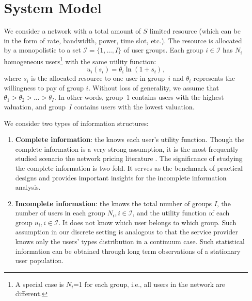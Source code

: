 \documentclass[twocolumn,10pt,twosided]{IEEEtran}
\begin{document}
\section{System Model}
We consider a network with a total amount of $S$ limited resource (which can be in the form of rate, bandwidth, power, time slot, etc.). The resource is allocated by a monopolistic  to a set $\mathcal{I}=\{1,\ldots,I\}$ of user groups.  Each group $i\in\mathcal{I}$ has $N_i$ homogeneous users\footnote{A special case is $N_{i}$=1 for each group, i.e., all users in the network are different.} with the same utility function:
\begin{equation}
    u_i(s_i)=\theta_i \ln(1+s_i),
\label{eq:log_u}
\end{equation}
where $s_i$ is the allocated resource to one user in group~$i$ and $\theta_i$ represents the willingness to pay of group $i$.  Without loss of generality, we assume that $\theta_1>\theta_2>\dots>\theta_I$. In other words, group~$1$ contains users with the highest valuation, and group~$I$ contains users with the lowest valuation.

We consider two types of information structures:
\begin{enumerate}
    \item \textbf{Complete information}: the  knows each user's utility function.
 Though the complete information is a very strong assumption, it is the most frequently studied scenario the network pricing literature \cite{basar2002revenue,shen2007optimal,daoud2008stackelberg,jiang2008time, hande2010pricing, he2005pricing, shakkottai2006economics, voja}. The significance of studying the complete information is two-fold. It serves as the benchmark of practical designs and provides important insights for the incomplete information analysis.

	 \item \textbf{Incomplete information}: the  knows the total number of groups $I$, the number of users in each group $N_{i}, i\in\mathcal{I}$, and the utility function of each group $u_{i}, i\in\mathcal{I}$. It does not know which user belongs to which group.
Such assumption in our discrete setting is analogous to that the service provider knows only the users' types distribution in a continuum case. Such statistical information can be obtained through long term observations of a stationary user population.
\end{enumerate}
\end{document}
